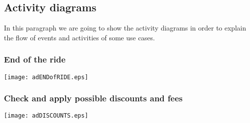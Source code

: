 \pagebreak
\subsection{Activity diagrams}
In this paragraph we are going to show the activity diagrams in order to explain the flow of events and activities of some use cases.

\subsubsection{End of the ride}
	\centerline{
		\texttt{[image: adENDofRIDE.eps]}}

\subsubsection{Check and apply possible discounts and fees}
	\centerline{
		\texttt{[image: adDISCOUNTS.eps]}}